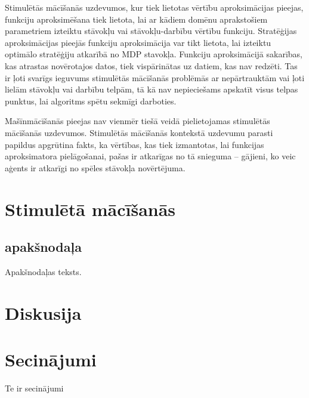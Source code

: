 \documentclass{ludis} %
\begin{document}
Stimulētās mācīšanās uzdevumos, kur tiek lietotas vērtību aproksimācijas pieejas, funkciju aproksimēšana tiek lietota, lai ar kādiem domēnu aprakstošiem parametriem izteiktu stāvokļu vai stāvokļu-darbību vērtību funkciju. Stratēģijas aproksimācijas pieejās funkciju aproksimācija var tikt lietota, lai izteiktu optimālo stratēģiju atkarībā no MDP stavokļa.
Funkciju aproksimācijā sakarības, kas atrastas novērotajos datos, tiek vispārinātas uz datiem, kas nav redzēti. Tas ir ļoti svarīgs ieguvums stimulētās mācīšanās problēmās ar nepārtrauktām vai ļoti lielām stāvokļu vai darbību telpām, tā kā nav nepieciešams apskatīt visus telpas punktus, lai algoritms spētu sekmīgi darboties.

Mašīnmācīšanās pieejas nav vienmēr tiešā veidā pielietojamas stimulētās mācīšanās uzdevumos.
Stimulētās mācīšanās kontekstā uzdevumu parasti papildus apgrūtina fakts, ka vērtības, kas tiek izmantotas, lai funkcijas aproksimatora pielāgošanai, pašas ir atkarīgas no tā snieguma -- gājieni, ko veic aģents ir atkarīgi no spēles stāvokļa novērtējuma.

\chapter{Stimulētā mācīšanās} \label{chap:stim}
\section{apakšnodaļa}
Apakšnodaļas teksts.

\chapter{Diskusija}
\chapter{Secinājumi}
Te ir secinājumi

\printbibliography
\end{document}
